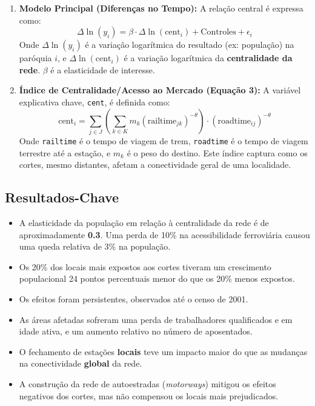\documentclass[12pt]{article}
\begin{document}
\begin{enumerate}
    \item \textbf{Modelo Principal (Diferenças no Tempo):} A relação central é expressa como:
    \[
    \Delta \ln(y_i) = \beta \cdot \Delta \ln(\text{cent}_i) + \text{Controles} + \epsilon_i
    \]
    Onde $\Delta \ln(y_i)$ é a variação logarítmica do resultado (ex: população) na paróquia $i$, e $\Delta \ln(\text{cent}_i)$ é a variação logarítmica da \textbf{centralidade da rede}. $\beta$ é a elasticidade de interesse.
    \vspace{0.5cm}

    \item \textbf{Índice de Centralidade/Acesso ao Mercado (Equação 3):} A variável explicativa chave, \texttt{cent}, é definida como:
    \[
    \text{cent}_i = \sum_{j \in J} \left( \sum_{k \in K} m_k (\text{railtime}_{jk})^{-\theta} \right) \cdot (\text{roadtime}_{ij})^{-\theta}
    \]
    Onde \texttt{railtime} é o tempo de viagem de trem, \texttt{roadtime} é o tempo de viagem terrestre até a estação, e $m_k$ é o peso do destino. Este índice captura como os cortes, mesmo distantes, afetam a conectividade geral de uma localidade.
\end{enumerate}

\subsection*{Resultados-Chave}
\begin{itemize}
    \item A elasticidade da população em relação à centralidade da rede é de aproximadamente \textbf{0.3}. Uma perda de 10\% na acessibilidade ferroviária causou uma queda relativa de 3\% na população.
    \item Os 20\% dos locais mais expostos aos cortes tiveram um crescimento populacional 24 pontos percentuais menor do que os 20\% menos expostos.
    \item Os efeitos foram persistentes, observados até o censo de 2001.
    \item As áreas afetadas sofreram uma perda de trabalhadores qualificados e em idade ativa, e um aumento relativo no número de aposentados.
    \item O fechamento de estações \textbf{locais} teve um impacto maior do que as mudanças na conectividade \textbf{global} da rede.
    \item A construção da rede de autoestradas (\textit{motorways}) mitigou os efeitos negativos dos cortes, mas não compensou os locais mais prejudicados.
\end{itemize}
\end{document}
